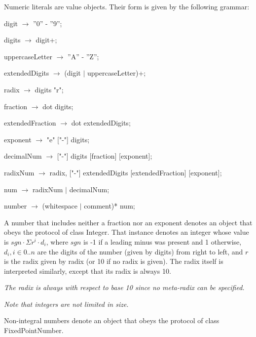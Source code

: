 \documentclass{article}
\newcommand{\code}[1]{{\sf #1}}
\begin{document}
Numeric literals are value objects. Their form is given by the following grammar:
\begin{newspeak}
digit $\rightarrow$ ''0'' - ''9'';

digits $\rightarrow$  digit+;

uppercaseLetter $\rightarrow$ ''A'' - ''Z'';

extendedDigits $\rightarrow$ (digit $|$ uppercaseLetter)+;

radix $\rightarrow$ digits "r";
                   
fraction $\rightarrow$  dot digits;

extendedFraction $\rightarrow$  dot extendedDigits;
                        
exponent $\rightarrow$  "e"  ["-"] digits;

decimalNum $\rightarrow$ ["-"] digits [fraction] [exponent];

radixNum $\rightarrow$ radix,
                ["-"] 
               extendedDigits 
               [extendedFraction]
               [exponent];
                                                                                                                   
num $\rightarrow$   radixNum $|$ decimalNum;
                                                                                                         
number $\rightarrow$  (whitespace $|$ comment)*  num;
\end{newspeak}


A number that includes neither a fraction nor an exponent denotes an object that obeys the protocol of class \code{Integer}.
That instance denotes an integer whose value is  $sgn \cdot \Sigma r^i \cdot  d_i$, where $sgn$ is  -1 if a leading minus was present and 1 otherwise, $d_i, i \in 0 .. n$ are the digits of the number (given by \code{digits}) from right to left, and $r $ is the radix given by \code{radix} (or 10 if no radix is given). The radix itself is interpreted similarly, except that its radix is always 10.

{\it  The radix is always with respect to base 10 since no meta-radix can be specified.}

{\it  Note that integers are not limited in size.}

Non-integral numbers denote an object that obeys the protocol of class \code{FixedPointNumber}.
\end{document}
